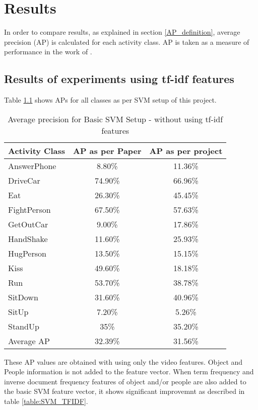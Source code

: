 \chapter{Results}

\label{ch5_RESULTS}
In order to compare results, as explained in section \ref{AP_definition}, 
average precision (AP) is calculated for each activity class. AP is
taken as a measure of performance in the work of \cite{actionsInContext}.

\section{Results of experiments using tf-idf features}
Table \ref{table:SVM_Setup} shows APs for all classes as per SVM setup of this project.


\begin{table}[t,here]
\centering
\captionsetup{justification=centering,margin=2cm}
\begin{tabular}{| l | c | c |}
\hline
{\bf Activity Class} & {\bf AP as per Paper} & {\bf AP as per project} \\ \hline
%
AnswerPhone & 8.80\% & 11.36\% \\ \hline
DriveCar & 74.90\% & 66.96\% \\ \hline
Eat & 26.30\% & 45.45\% \\ \hline
FightPerson & 67.50\% & 57.63\% \\ \hline
GetOutCar & 9.00\% & 17.86\% \\ \hline
HandShake & 11.60\% & 25.93\% \\ \hline
HugPerson & 13.50\% & 15.15\% \\ \hline
Kiss & 49.60\% & 18.18\% \\ \hline
Run & 53.70\% & 38.78\% \\ \hline
SitDown & 31.60\% & 40.96\% \\ \hline
SitUp & 7.20\% & 5.26\% \\ \hline
StandUp & 35\% & 35.20\% \\ \hline
Average AP & 32.39\% & 31.56\% \\ \hline
%
\end{tabular}
\caption{Average precision for Basic SVM Setup - without using tf-idf features}
\label{table:SVM_Setup}
\end{table}

These AP values are obtained with using only the video features. 
Object and People information is not added to the feature vector.
When term frequency and inverse document frequency features of 
object and/or people are also added to the basic SVM feature vector, 
it shows significant improvemnt as described in table \ref{table:SVM_TFIDF}.

